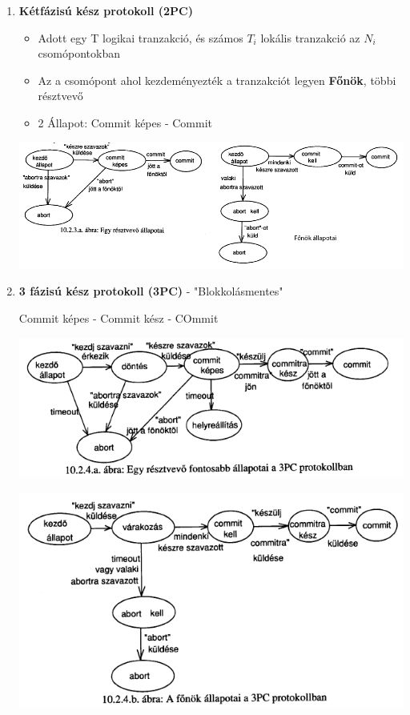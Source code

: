 \begin{enumerate}
\begin{enumerate}
			\end{enumerate}

		\item \textbf{Kétfázisú kész protokoll (2PC)}

			\begin{itemize}
				\item Adott egy T logikai tranzakció, és számos $T_i$ lokális tranzakció az $N_i$ csomópontokban
				\item Az a csomópont ahol kezdeményezték a tranzakciót legyen \textbf{Főnök}, többi résztvevő
				\item 2 Állapot: Commit képes - Commit

			\end{itemize}

				\includegraphics[scale=0.55]{img/2PC}

		\item \textbf{3 fázisú kész protokoll (3PC)} - "Blokkolásmentes"

			\forceindent Commit képes - Commit kész - COmmit

		\includegraphics[scale=0.7]{img/3PC1}

		\includegraphics[scale=0.7]{img/3PC2}


\end{enumerate}
